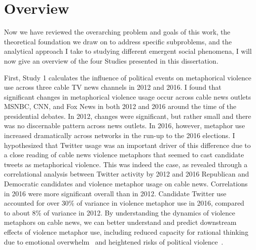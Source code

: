 \documentclass[12pt,letterpaper]{article}
\begin{document}
\section{Overview}

Now we have reviewed the overarching problem and goals of this work, the
theoretical foundation we draw on to address specific subproblems, and
the analytical approach I take to studying different emergent social
phenomena, I will now give an overview of the four Studies presented in this
dissertation.

First, Study 1  
calculates the influence of political events on metaphorical violence use across
three cable TV news channels in 2012 and 2016. I found that significant changes
in metaphorical violence usage occur across cable news outlets MSNBC, CNN, and
Fox News in both 2012 and 2016 around the time of the presidential debates. 
In 2012, changes were significant, but rather small and there was no discernable
pattern across news outlets. In 2016, however, metaphor use increased dramatically
across networks in the run-up to the 2016 elections.  
I hypothesized that Twitter usage was an important driver of this difference due to 
a close reading of cable news violence metaphors that seemed to cast candidate
tweets as metaphorical violence. This was indeed the case, as revealed through a
correlational analysis between Twitter activity by 2012 and 2016 Republican
and Democratic candidates and violence metaphor usage on cable news. Correlations
in 2016 were more significant overall than in 2012. Candidate Twitter use
accounted for over 30\% of variance in violence metaphor use in 2016, compared to
about 8\% of variance in 2012. By understanding the
dynamics of violence metaphors on cable news, we can better understand and 
predict downstream effects of violence metaphor use, including reduced capacity
for rational thinking due to emotional overwhelm~\cite{Suhay2018} and heightened
risks of political violence~\cite{Kalmoe2014,Kalmoe2018}.
\end{document}
